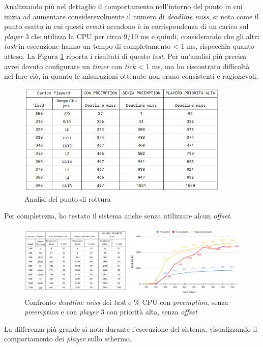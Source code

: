 \documentclass{article}
\begin{document}
Analizzando più nel dettaglio il comportamento nell'intorno del punto in cui inizia ad aumentare considerevolmente il numero di \textit{deadline miss}, si nota come il punto esatto in cui questi eventi accadono è in corrispondenza di un carico sul \textit{player} 3 che utilizza la CPU per circa 9/10 ms e quindi, considerando che gli altri \textit{task} in esecuzione hanno un tempo di completamento < 1 ms, rispecchia quanto atteso. La Figura \ref{punto-rottura} riporta i risultati di questo \textit{test}. Per un'analisi più precisa avrei dovuto configurare un \textit{timer} con \textit{tick} < 1 ms, ma ho riscontrato difficoltà nel fare ciò, in quanto le misurazioni ottenute non erano consistenti e ragionevoli.

\begin{figure}[H]
	\centering
	\includegraphics[width=4in]{image/punto-rottura.png}
	\caption{Analisi del punto di rottura}
	\label{punto-rottura}
\end{figure}

Per completezza, ho testato il sistema anche senza utilizzare alcun \textit{offset}.
\begin{figure}[H]
	\centering
	\includegraphics[width=6in]{image/CARICO-AUTOSTART.png}
	\caption{Confronto \textit{deadline miss} dei \textit{task} e \% CPU con \textit{preemption}, senza \textit{preemption} e con \textit{player} 3 con priorità alta, senza \textit{offset}}
	\label{siC-noO}
\end{figure}
La differenza più grande si nota durante l'esecuzione del sistema, visualizzando il comportamento dei \textit{player} sullo schermo. 
\end{document}
